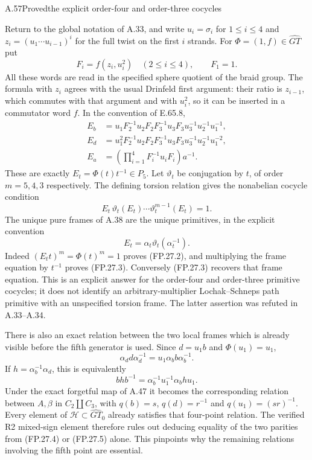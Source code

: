 \begin{statement}{A.57}{Proved}{the explicit order-four and order-three cocycles}
\end{statement}
Return to the global notation of A.33, and write
$u_i=\sigma_i$ for $1\leq i\leq4$ and
$z_i=(u_1\cdots u_{i-1})^i$ for the full twist on the first $i$
strands. For $\Phi=(1,f)\in\widehat{GT}$ put
\[
 F_i=f(z_i,u_i^2)\quad(2\leq i\leq4),\qquad F_1=1.
\]
All these words are read in the specified sphere quotient of the braid
group. The formula with $z_i$ agrees with the usual Drinfeld first
argument: their ratio is $z_{i-1}$, which commutes with that argument
and with $u_i^2$, so it can be inserted in a commutator word $f$.
In the convention of E.65.8,
\[
 \begin{split}
 E_b&=u_1F_2^{-1}u_2F_2F_3^{-1}u_3F_3
                         u_3^{-1}u_2^{-1}u_1^{-1},\\
 E_d&=u_1^2F_2^{-1}u_2F_2F_3^{-1}u_3F_3
                         u_3^{-1}u_2^{-1}u_1^{-2},\\
 E_a&=\left(\prod_{i=1}^{4}F_i^{-1}u_iF_i\right)a^{-1}.
 \end{split}
 \tag{FP.27.1}
\]
These are exactly $E_t=\Phi(t)t^{-1}\in P_5$.
Let $\vartheta_t$ be conjugation by $t$, of order $m=5,4,3$ respectively.
The defining torsion relation gives the nonabelian cocycle condition
\[
 E_t\,\vartheta_t(E_t)\cdots\vartheta_t^{m-1}(E_t)=1.
 \tag{FP.27.2}
\]
The unique pure frames of A.38 are the unique primitives, in the
explicit convention
\[
 E_t=\alpha_t\vartheta_t(\alpha_t^{-1}).
 \tag{FP.27.3}
\]
Indeed $(E_tt)^m=\Phi(t)^m=1$ proves (FP.27.2), and multiplying the
frame equation by $t^{-1}$ proves (FP.27.3). Conversely (FP.27.3)
recovers that frame equation. This is an explicit answer for the
order-four and order-three primitive cocycles; it does not identify an
arbitrary-multiplier Lochak--Schneps path primitive with an unspecified
torsion frame. The latter assertion was refuted in A.33--A.34.

There is also an exact relation between the two local frames which is
already visible before the fifth generator is used. Since $d=u_1b$ and
$\Phi(u_1)=u_1$,
\[
 \alpha_d d\alpha_d^{-1}
       =u_1\alpha_b b\alpha_b^{-1}.
 \tag{FP.27.4}
\]
If $h=\alpha_b^{-1}\alpha_d$, this is equivalently
\[
 b h b^{-1}=\alpha_b^{-1}u_1^{-1}\alpha_b h u_1.
 \tag{FP.27.5}
\]
Under the exact forgetful map of A.47 it becomes the corresponding
relation between $A,\beta$ in $C_2\amalg C_3$, with $q(b)=s$,
$q(d)=r^{-1}$ and $q(u_1)=(sr)^{-1}$. Every element of
$\mathcal H\subset\widehat{GT}_0$ already satisfies that four-point
relation. The verified R2 mixed-sign element therefore rules out
deducing equality of the two parities from (FP.27.4) or (FP.27.5)
alone. This pinpoints why the remaining relations involving the fifth
point are essential.

